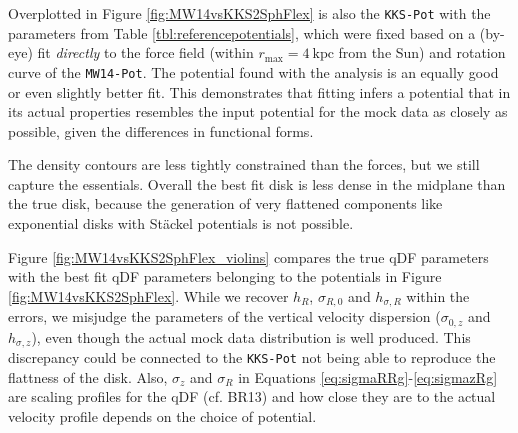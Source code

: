 Overplotted in Figure \ref{fig:MW14vsKKS2SphFlex} is also the \texttt{KKS-Pot} with the parameters from Table \ref{tbl:referencepotentials}, which were fixed based on a (by-eye) fit \emph{directly} to the force field (within $r_\text{max}=4~\text{kpc}$ from the Sun) and rotation curve of the \texttt{MW14-Pot}. The potential found with the \RM{} analysis is an equally good or even slightly better fit. This demonstrates that \RM{} fitting infers a potential that in its actual properties resembles the input potential for the mock data as closely as possible, given the differences in functional forms.

The density contours are less tightly constrained than the forces, but we still capture the essentials. Overall the best fit disk is less dense in the midplane than the true disk, because the generation of very flattened components like exponential disks with St\"{a}ckel potentials is not possible.


Figure \ref{fig:MW14vsKKS2SphFlex_violins} compares the true qDF parameters with the best fit qDF parameters belonging to the potentials in Figure \ref{fig:MW14vsKKS2SphFlex}. While we recover $h_R$, $\sigma_{R,0}$ and $h_{\sigma,R}$ within the errors, we misjudge the parameters of the vertical velocity dispersion ($\sigma_{0,z}$ and $h_{\sigma,z}$), even though the actual mock data distribution is well produced. This discrepancy could be connected to the \texttt{KKS-Pot} not being able to reproduce the flattness of the disk. Also, $\sigma_z$ and $\sigma_R$ in Equations \ref{eq:sigmaRRg}-\ref{eq:sigmazRg} are scaling profiles for the qDF (cf. BR13) and how close they are to the actual velocity profile depends on the choice of potential.










